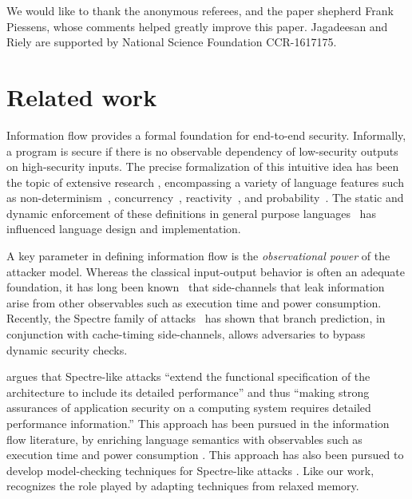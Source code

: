 \documentclass[conference]{IEEEtran}
\theoremstyle{plain}
\theoremstyle{definition}
\begin{document}
We would like to thank the anonymous referees,
and the paper shepherd Frank Piessens, whose
comments helped greatly improve this paper.
Jagadeesan and Riely are supported by National Science Foundation CCR-1617175.

\section{Related work}

Information flow provides a formal
foundation for end-to-end security.  Informally, a program is secure
if there is no observable dependency of low-security outputs on high-security inputs.
The precise formalization of this intuitive idea has been the topic of
extensive research \cite{Sabelfeld:2006:LIS:2312191.2314769}, encompassing a variety of language
features such as non-determinism~\cite{Wittbold1990InformationFI},
concurrency~\cite{Smith:1998:SIF:268946.268975}, reactivity~\cite{O'Neill:2006:ISI:1155442.1155677}, and
probability~\cite{Gray:1992:TMF:2699806.2699811}. The static and dynamic enforcement
of these definitions in general purpose languages~\cite{myers-popl99} has %
influenced language design and implementation.

A key parameter in defining information flow is the \emph{observational power} of the attacker model. Whereas the classical
input-output behavior is often an adequate foundation,
it has long been known~\cite{Lampson:1973:NCP:362375.362389,Biswas:2017:STC:3058791.3023872} that side-channels that leak
information arise from other observables such as execution time and
power consumption.
Recently, the Spectre family of attacks~\cite{DBLP:journals/corr/abs-1801-01203} has
shown that branch prediction, in conjunction with cache-timing side-channels,
allows adversaries to bypass dynamic security checks.

\citet{Chien:2018} argues that Spectre-like attacks ``extend the functional
specification of the architecture to include its detailed performance'' and
thus ``making strong assurances of application security on a computing system
requires detailed performance information.''
This approach has been pursued in the information flow literature, by
enriching language semantics with observables such as execution time and  power consumption
\cite{Zhang:2012:LCM:2345156.2254078,hyperflow}.   This approach
has also been pursued to develop model-checking techniques for Spectre-like
attacks \cite{DBLP:conf/micro/TrippelLM18}.  Like our work,
\cite{DBLP:conf/micro/TrippelLM18} recognizes the role played by adapting
techniques from relaxed memory.
\end{document}
